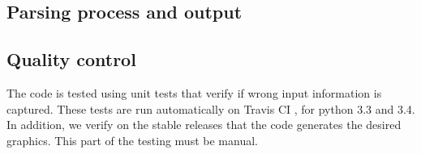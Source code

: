 \subsection*{Parsing process and output}

\subsection*{Quality control}

    The code is tested using unit tests that verify if wrong input information
    is captured. These tests are run automatically on Travis CI
    \cite{url:travis}, for python 3.3 and 3.4.
    In addition, we verify on the stable releases that the code generates the
    desired graphics. This part of the testing must be manual.


